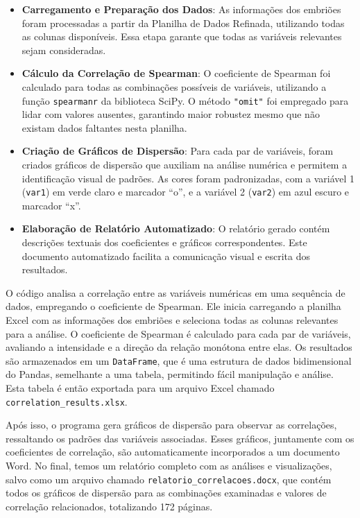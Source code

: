 \begin{itemize}
    \item \textbf{Carregamento e Preparação dos Dados}: As informações dos embriões foram processadas a partir da Planilha de Dados Refinada, utilizando todas as colunas disponíveis. Essa etapa garante que todas as variáveis relevantes sejam consideradas.
    \item \textbf{Cálculo da Correlação de Spearman}: O coeficiente de Spearman foi calculado para todas as combinações possíveis de variáveis, utilizando a função \texttt{spearmanr} da biblioteca SciPy. O método \texttt{"omit"} foi empregado para lidar com valores ausentes, garantindo maior robustez mesmo que não existam dados faltantes nesta planilha.
    \item \textbf{Criação de Gráficos de Dispersão}: Para cada par de variáveis, foram criados gráficos de dispersão que auxiliam na análise numérica e permitem a identificação visual de padrões. As cores foram padronizadas, com a variável 1 (\texttt{var1}) em verde claro e marcador ``o'', e a variável 2 (\texttt{var2}) em azul escuro e marcador ``x''.
    \item \textbf{Elaboração de Relatório Automatizado}: O relatório gerado contém descrições textuais dos coeficientes e gráficos correspondentes. Este documento automatizado facilita a comunicação visual e escrita dos resultados.
\end{itemize}

O código analisa a correlação entre as variáveis numéricas em uma sequência de dados, empregando o coeficiente de Spearman. Ele inicia carregando a planilha Excel com as informações dos embriões e seleciona todas as colunas relevantes para a análise. O coeficiente de Spearman é calculado para cada par de variáveis, avaliando a intensidade e a direção da relação monótona entre elas. Os resultados são armazenados em um \texttt{DataFrame}, que é uma estrutura de dados bidimensional do Pandas, semelhante a uma tabela, permitindo fácil manipulação e análise. Esta tabela é então exportada para um arquivo Excel chamado \texttt{correlation\_results.xlsx}.

Após isso, o programa gera gráficos de dispersão para observar as correlações, ressaltando os padrões das variáveis associadas. Esses gráficos, juntamente com os coeficientes de correlação, são automaticamente incorporados a um documento Word. No final, temos um relatório completo com as análises e visualizações, salvo como um arquivo chamado \texttt{relatorio\_correlacoes.docx}, que contém todos os gráficos de dispersão para as combinações examinadas e valores de correlação relacionados, totalizando 172 páginas. 

